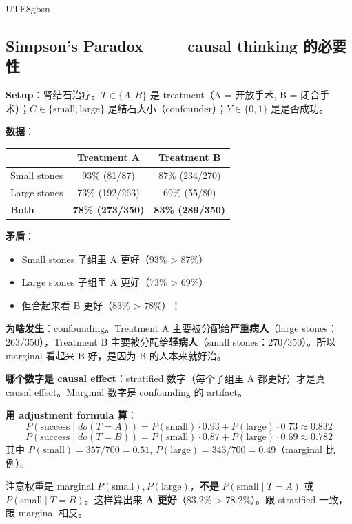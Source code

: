 \documentclass[11pt]{article}
\begin{document}
\begin{CJK}{UTF8}{gbsn}
\subsection{Simpson's Paradox —— causal thinking 的必要性}

\textbf{Setup}：肾结石治疗。$T \in \{A, B\}$ 是 treatment（A = 开放手术, B = 闭合手术）；$C \in \{\text{small}, \text{large}\}$ 是结石大小（confounder）；$Y \in \{0, 1\}$ 是是否成功。

\textbf{数据}：
\begin{center}
\begin{tabular}{|l|c|c|}
\hline
 & Treatment A & Treatment B \\
\hline
Small stones & 93\% (81/87) & 87\% (234/270) \\
Large stones & 73\% (192/263) & 69\% (55/80) \\
\hline
\textbf{Both} & \textbf{78\% (273/350)} & \textbf{83\% (289/350)} \\
\hline
\end{tabular}
\end{center}

\textbf{矛盾}：
\begin{itemize}[nosep]
  \item Small stones 子组里 A 更好（93\% > 87\%）
  \item Large stones 子组里 A 更好（73\% > 69\%）
  \item 但合起来看 B 更好（83\% > 78\%）！
\end{itemize}

\textbf{为啥发生}：confounding。Treatment A 主要被分配给\textbf{严重病人}（large stones：263/350），Treatment B 主要被分配给\textbf{轻病人}（small stones：270/350）。所以 marginal 看起来 B 好，是因为 B 的人本来就好治。

\textbf{哪个数字是 causal effect}：stratified 数字（每个子组里 A 都更好）才是真 causal effect。Marginal 数字是 confounding 的 artifact。

\textbf{用 adjustment formula 算}：
\[
P(\text{success} \mid do(T = A)) = P(\text{small}) \cdot 0.93 + P(\text{large}) \cdot 0.73 \approx 0.832
\]
\[
P(\text{success} \mid do(T = B)) = P(\text{small}) \cdot 0.87 + P(\text{large}) \cdot 0.69 \approx 0.782
\]
其中 $P(\text{small}) = 357/700 = 0.51$, $P(\text{large}) = 343/700 = 0.49$（marginal 比例）。

注意权重是 marginal $P(\text{small}), P(\text{large})$，\textbf{不是} $P(\text{small} \mid T = A)$ 或 $P(\text{small} \mid T = B)$。这样算出来 \textbf{A 更好}（83.2\% > 78.2\%）。跟 stratified 一致，跟 marginal 相反。


\end{CJK}
\end{document}
